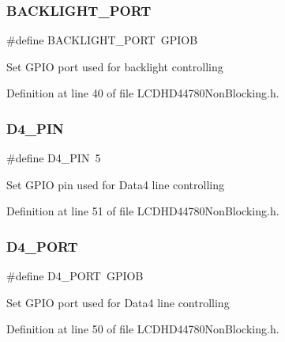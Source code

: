 \subsubsection{\texorpdfstring{BACKLIGHT\_PORT}{BACKLIGHT\_PORT}}
{\footnotesize\ttfamily \#define B\+A\+C\+K\+L\+I\+G\+H\+T\+\_\+\+P\+O\+RT~G\+P\+I\+OB}

Set G\+P\+IO port used for backlight controlling 

Definition at line 40 of file L\+C\+D\+H\+D44780\+Non\+Blocking.\+h.

\mbox{\label{group___l_c_d_h_d44780_non_blocking_ga397c2c535f67a13298ac59cd4a5aba4c_ga397c2c535f67a13298ac59cd4a5aba4c}} 
\subsubsection{\texorpdfstring{D4\_PIN}{D4\_PIN}}
{\footnotesize\ttfamily \#define D4\+\_\+\+P\+IN~5}

Set G\+P\+IO pin used for Data4 line controlling 

Definition at line 51 of file L\+C\+D\+H\+D44780\+Non\+Blocking.\+h.

\mbox{\label{group___l_c_d_h_d44780_non_blocking_ga7b72b21958bd11fd718723b95bc335d2_ga7b72b21958bd11fd718723b95bc335d2}} 
\subsubsection{\texorpdfstring{D4\_PORT}{D4\_PORT}}
{\footnotesize\ttfamily \#define D4\+\_\+\+P\+O\+RT~G\+P\+I\+OB}

Set G\+P\+IO port used for Data4 line controlling 

Definition at line 50 of file L\+C\+D\+H\+D44780\+Non\+Blocking.\+h.

\mbox{\label{group___l_c_d_h_d44780_non_blocking_ga9c3b90946c5e3746cf8b032e34c7d824_ga9c3b90946c5e3746cf8b032e34c7d824}} 
